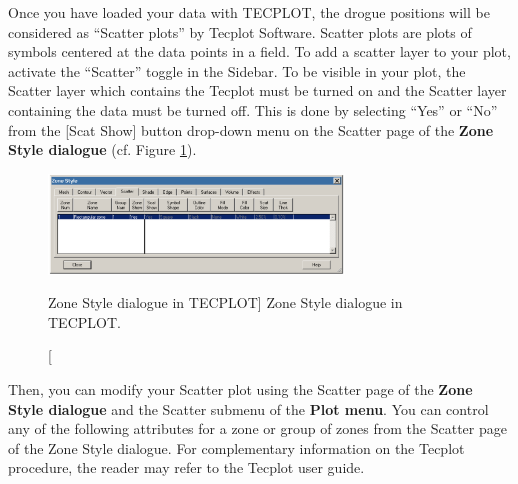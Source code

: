 Once you have loaded your data with TECPLOT, the drogue positions will be
considered as ``Scatter plots'' by Tecplot Software. Scatter plots are plots of
symbols centered at the data points in a field. To add a scatter layer to your
plot, activate the ``Scatter'' toggle in the Sidebar. To be visible in your
plot, the Scatter layer which contains the Tecplot  must be turned on and the Scatter layer containing the  data must be turned off. This is done by selecting ``Yes'' or ``No'' from
the [Scat Show] button drop-down menu on the Scatter page of the \textbf{Zone
Style dialogue} (cf. Figure \ref{fig:zone_style}).

\begin{figure}[H]%
\begin{center}
%
  \includegraphics[width=0.7\textwidth]{./graphics/zone_style}
%
\end{center}
\caption
[Zone Style dialogue in TECPLOT]
{Zone Style dialogue in TECPLOT.}
\label{fig:zone_style}
\end{figure}

Then, you can modify your Scatter plot using the Scatter page of the
\textbf{Zone Style dialogue} and the Scatter submenu of the \textbf{Plot menu}.
You can control any of the following attributes for a zone or group of zones
from the Scatter page of the Zone Style dialogue. For complementary information
on the Tecplot procedure, the reader may refer to the Tecplot user guide.

